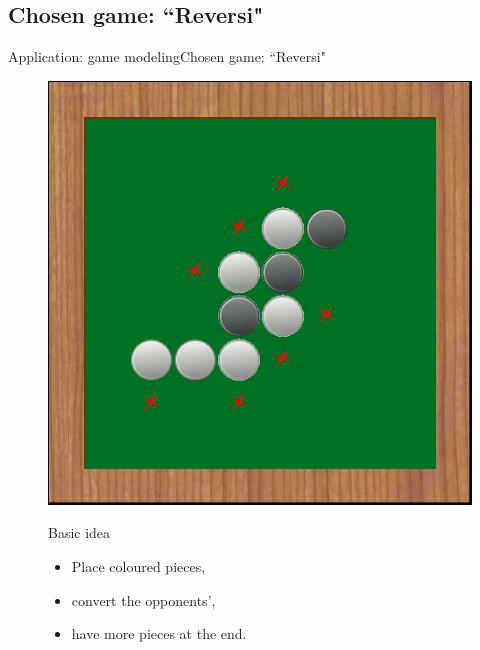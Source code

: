 \subsection{Chosen game: ``Reversi"}
\begin{frame}{Application: game modeling}{Chosen game: ``Reversi"}

\begin{figure}[ht]
\begin{minipage}[t]{0.4\linewidth}
\vspace{0pt}
\centering
\includegraphics[width=\textwidth]{img/application/reversi.png}
\end{minipage}
\hfill
\begin{minipage}[t]{0.5\linewidth}
\vspace{0pt}
\begin{block}{Basic idea}
\begin{itemize} 
\item Place coloured pieces,
\item convert the opponents',
\item have more pieces at the end.
\end{itemize}
\end{block}
\end{minipage}

\end{figure}

\end{frame}

